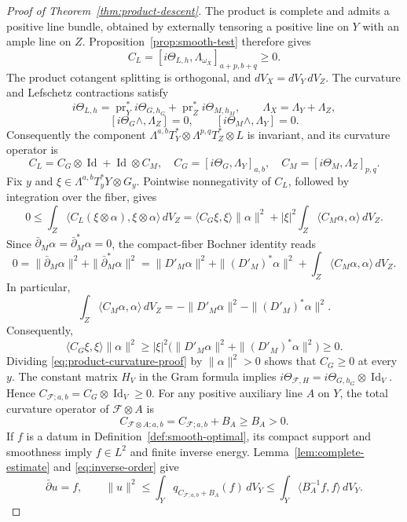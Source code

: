 \documentclass[11pt,reqno]{amsart}
\numberwithin{equation}{section}
\theoremstyle{definition}
\theoremstyle{remark}
\newcommand{\Id}{\operatorname{Id}}
\begin{document}
\begin{proof}[Proof of Theorem~\ref{thm:product-descent}]
The product is complete and admits a positive line bundle, obtained
by externally tensoring a positive line on $Y$ with an ample line on
$Z$.  Proposition~\ref{prop:smooth-test} therefore gives
\[
 C_L=[i\Theta_{L,h},\Lambda_{\omega_X}]_{a+p,b+q}\ge0.
\]
The product cotangent splitting is orthogonal, and
$dV_X=dV_Y\,dV_Z$.  The curvature and Lefschetz contractions satisfy
\[
 i\Theta_{L,h}=\operatorname{pr}_Y^*i\Theta_{G,h_G}
                +\operatorname{pr}_Z^*i\Theta_{M,h_M},\qquad
 \Lambda_X=\Lambda_Y+\Lambda_Z,
\]
\[
 [i\Theta_G\wedge,\Lambda_Z]=0,\qquad
 [i\Theta_M\wedge,\Lambda_Y]=0.
\]
Consequently the component
$\Lambda^{a,b}T_Y^*\otimes\Lambda^{p,q}T_Z^*\otimes L$
is invariant, and its curvature operator is
\[
 C_L=C_G\otimes\Id+\Id\otimes C_M,\quad
 C_G=[i\Theta_G,\Lambda_Y]_{a,b},\quad
 C_M=[i\Theta_M,\Lambda_Z]_{p,q}.
\]
Fix $y$ and $\xi\in\Lambda^{a,b}T_y^*Y\otimes G_y$.  Pointwise
nonnegativity of $C_L$, followed by integration over the fiber,
gives
\[
 0\le\int_Z\langle C_L(\xi\otimes\alpha),
                              \xi\otimes\alpha\rangle\,dV_Z
   =\langle C_G\xi,\xi\rangle\|\alpha\|^2
      +|\xi|^2\int_Z\langle C_M\alpha,\alpha\rangle\,dV_Z .
\]
Since $\bar\partial_M\alpha=\bar\partial_M^*\alpha=0$, the
compact-fiber Bochner identity reads
\[
 0=\|\bar\partial_M\alpha\|^2+\|\bar\partial_M^*\alpha\|^2
   =\|D'_M\alpha\|^2+\|(D'_M)^*\alpha\|^2
         +\int_Z\langle C_M\alpha,\alpha\rangle\,dV_Z .
\]
In particular,
\[
 \int_Z\langle C_M\alpha,\alpha\rangle\,dV_Z
 =-\|D'_M\alpha\|^2-\|(D'_M)^*\alpha\|^2.
\]
Consequently,
\begin{equation}\label{eq:product-curvature-proof}
 \langle C_G\xi,\xi\rangle\|\alpha\|^2
 \ge |\xi|^2\bigl(\|D'_M\alpha\|^2+\|(D'_M)^*\alpha\|^2\bigr)
 \ge0.
\end{equation}
Dividing \eqref{eq:product-curvature-proof} by $\|\alpha\|^2>0$
shows that $C_G\ge0$ at every $y$.  The constant matrix $H_V$ in
the Gram formula implies
$i\Theta_{\mathcal F,H}=i\Theta_{G,h_G}\otimes\Id_V$.
Hence
$C_{\mathcal F;a,b}=C_G\otimes\Id_V\ge0$.
For any positive auxiliary line $A$ on $Y$, the total curvature
operator of $\mathcal F\otimes A$ is
\[
 C_{\mathcal F\otimes A;a,b}=C_{\mathcal F;a,b}+B_A\ge B_A>0.
\]
If $f$ is a datum in Definition~\ref{def:smooth-optimal}, its compact
support and smoothness imply $f\in L^2$ and finite inverse energy.
Lemma~\ref{lem:complete-estimate} and \eqref{eq:inverse-order} give
\[
 \bar\partial u=f,\qquad
 \|u\|^2\le\int_Yq_{C_{\mathcal F;a,b}+B_A}(f)\,dV_Y
       \le\int_Y\langle B_A^{-1}f,f\rangle\,dV_Y .
\]
\end{proof}
\end{document}
